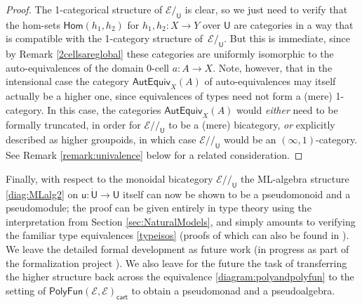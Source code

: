 \documentclass[12pt,reqno]{amsart}
\newcommand{\EE}{\ensuremath{\mathcal{E}}}
\newcommand{\Hom}{\ensuremath{\mathsf{Hom}}}
\renewcommand{\to}{\ensuremath{\rightarrow}}
\renewcommand{\t}{\ensuremath{\mathsf{u}}}
\newcommand{\T}{\ensuremath{\mathsf{U}}}
\newcommand{\TT}{\ensuremath{\dot{\mathsf{U}}}}
\theoremstyle{remark}
\theoremstyle{definition}
\begin{document}
\begin{proof}
The 1-categorical structure of $\EE/_\T$ is clear, so we just need to verify that the hom-sets $\Hom(h_1, h_2)$ for $h_1, h_2 : X \to Y$ over $\T$  are categories in a way that is compatible with the 1-category structure of~$\EE/_\T$.  But this is immediate, since by Remark \ref{2cellsareglobal} these categories are uniformly isomorphic to the auto-equivalences of the domain 0-cell $a: A\to X$.  Note, however, that in the intensional case the category $\mathsf{AutEquiv}_X(A)$ of auto-equivalences may itself actually be a higher one, since equivalences of types need not form a (mere) 1-category.  In this case, the categories $\mathsf{AutEquiv}_X(A)$ would \emph{either} need to be formally truncated, in order for $\EE/\!/_\T$ to be a (mere) bicategory, \emph{or} explicitly described as higher groupoids, in which case $\EE/\!/_\T$ would be an $(\infty, 1)$-category.  See Remark \ref{remark:univalence} below for a related consideration.
\end{proof}

Finally, with respect to the monoidal bicategory $\EE/\!/_\T$ the ML-algebra structure \eqref{diag:MLalg2} on $\t : \TT\to\T$ itself can now be shown to be a pseudomonoid and a pseudomodule; the proof can be given entirely in type theory using the interpretation from Section \ref{sec:NaturalModels}, and simply amounts to verifying the familiar type equivalences \eqref{typeisos} (proofs of which can also be found in \cite[Chapter 2]{HoTTbook}).  We leave the detailed formal development as future work (in progress as part of the formalization project \cite{HoTTLean}).  We also leave for the future the task of transferring the higher structure back across the equivalence \eqref{diagram:polyandpolyfun} to the setting of $\mathsf{PolyFun}(\EE, \EE)_{\mathsf{cart}}$ to obtain a pseudomonad and a pseudoalgebra.
\end{document}
